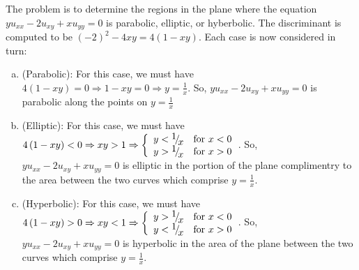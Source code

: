 \begin{homeworkProblem}
The problem is to determine the regions in the plane where the equation 
$yu_{xx}  - 2u_{xy}  + xu_{yy}  = 0$ is parabolic, elliptic, or 
hyberbolic. The discriminant is computed to be $\left( { - 2} \right)^2  - 4xy = 4\left( {1 - xy} \right)$. Each case is now considered in turn:
\begin{enumerate}[(a)]
\item (Parabolic): For this case, we must have $4\left( {1 - xy} \right) = 0 \Rightarrow 1 - xy = 0 \Rightarrow y = \frac{1}{x}$. So, $yu_{xx}  - 2u_{xy}  + xu_{yy}  = 0$ is parabolic along the points on $y = \frac{1}{x}$
\item (Elliptic): For this case, we must have $
4\left( {1 - xy} \right) < 0 \Rightarrow xy > 1 \Rightarrow \left\{ {\begin{array}{*{20}c}
   {y < {\raise0.7ex\hbox{$1$} \!\mathord{\left/
 {\vphantom {1 x}}\right.\kern-\nulldelimiterspace}
\!\lower0.7ex\hbox{$x$}}} & {{\text{for }}x < 0}  \\
   {y > {\raise0.7ex\hbox{$1$} \!\mathord{\left/
 {\vphantom {1 x}}\right.\kern-\nulldelimiterspace}
\!\lower0.7ex\hbox{$x$}}} & {{\text{for }}x > 0}  \\

 \end{array} } \right.
$. So, $yu_{xx}  - 2u_{xy}  + xu_{yy}  = 0$ is elliptic in the portion of the plane complimentry to the area between the two curves which comprise $y = \frac{1}{x}$.
\item (Hyperbolic):
For this case, we must have $
4\left( {1 - xy} \right) > 0 \Rightarrow xy < 1 \Rightarrow \left\{ {\begin{array}{*{20}c}
   {y > {\raise0.7ex\hbox{$1$} \!\mathord{\left/
 {\vphantom {1 x}}\right.\kern-\nulldelimiterspace}
\!\lower0.7ex\hbox{$x$}}} & {{\text{for }}x < 0}  \\
   {y < {\raise0.7ex\hbox{$1$} \!\mathord{\left/
 {\vphantom {1 x}}\right.\kern-\nulldelimiterspace}
\!\lower0.7ex\hbox{$x$}}} & {{\text{for }}x > 0}  \\

 \end{array} } \right.
$. So, $yu_{xx}  - 2u_{xy}  + xu_{yy}  = 0$ is hyperbolic in the area of the plane between the two curves which comprise $y = \frac{1}{x}$.


\end{enumerate}
\end{homeworkProblem}
